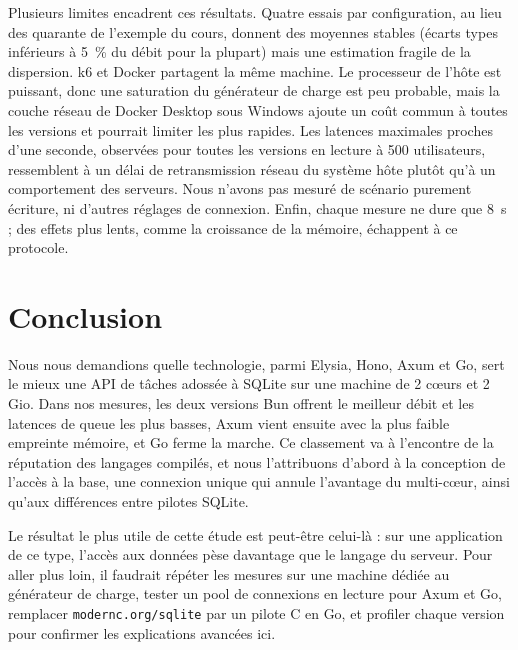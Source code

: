 \documentclass[conference,a4paper]{IEEEtran}
\begin{document}
Plusieurs limites encadrent ces résultats. Quatre essais par
configuration, au lieu des quarante de l'exemple du cours, donnent des
moyennes stables (écarts types inférieurs à 5~\% du débit pour la
plupart) mais une estimation fragile de la dispersion. k6 et Docker
partagent la même machine. Le processeur de l'hôte est puissant, donc
une saturation du générateur de charge est peu probable, mais la
couche réseau de Docker Desktop sous Windows ajoute un coût commun à
toutes les versions et pourrait limiter les plus rapides. Les latences maximales
proches d'une seconde, observées pour toutes les versions en lecture à
500 utilisateurs, ressemblent à un délai de retransmission réseau du
système hôte plutôt qu'à un comportement des serveurs. Nous n'avons pas
mesuré de scénario purement écriture, ni d'autres réglages de connexion.
Enfin, chaque mesure ne dure que 8~s ; des effets plus lents, comme la
croissance de la mémoire, échappent à ce protocole.

\section{Conclusion}
Nous nous demandions quelle technologie, parmi Elysia, Hono, Axum et Go,
sert le mieux une API de tâches adossée à SQLite sur une machine de
2 cœurs et 2 Gio. Dans nos mesures, les deux versions Bun offrent le
meilleur débit et les latences de queue les plus basses, Axum vient
ensuite avec la plus faible empreinte mémoire, et Go ferme la marche.
Ce classement va à l'encontre de la réputation des langages compilés,
et nous l'attribuons d'abord à la conception de l'accès à la base, une
connexion unique qui annule l'avantage du multi-cœur, ainsi qu'aux
différences entre pilotes SQLite.

Le résultat le plus utile de cette étude est peut-être celui-là : sur
une application de ce type, l'accès aux données pèse davantage que le
langage du serveur. Pour aller plus loin, il faudrait répéter les
mesures sur une machine dédiée au générateur de charge, tester un pool
de connexions en lecture pour Axum et Go, remplacer
\texttt{modernc.org/sqlite} par un pilote C en Go, et profiler chaque
version pour confirmer les explications avancées ici.
\end{document}
